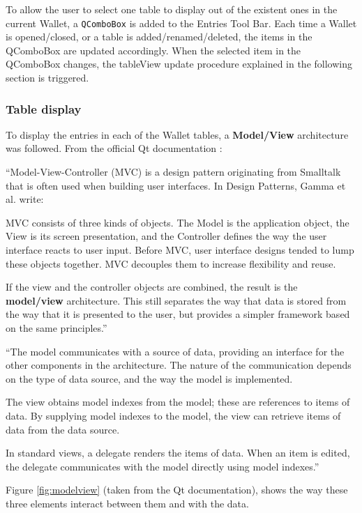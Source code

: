 To allow the user to select one table to display out of the existent ones in the current Wallet, a \texttt{QComboBox} is added to the Entries Tool Bar. Each time a Wallet is opened/closed, or a table is added/renamed/deleted, the items in the QComboBox are updated accordingly. When the selected item in the QComboBox changes, the tableView update procedure explained in the following section is triggered.

\subsubsection*{Table display}
To display the entries in each of the Wallet tables, a \textbf{Model/View} architecture was followed. From the official Qt documentation \cite{modelview}:
 
``Model-View-Controller (MVC) is a design pattern originating from Smalltalk that is often used when building user interfaces. In Design Patterns, Gamma et al. write:

MVC consists of three kinds of objects. The Model is the application object, the View is its screen presentation, and the Controller defines the way the user interface reacts to user input. Before MVC, user interface designs tended to lump these objects together. MVC decouples them to increase flexibility and reuse.

If the view and the controller objects are combined, the result is the \textbf{model/view} architecture. This still separates the way that data is stored from the way that it is presented to the user, but provides a simpler framework based on the same principles.''

``The model communicates with a source of data, providing an interface for the other components in the architecture. The nature of the communication depends on the type of data source, and the way the model is implemented.

The view obtains model indexes from the model; these are references to items of data. By supplying model indexes to the model, the view can retrieve items of data from the data source.

In standard views, a delegate renders the items of data. When an item is edited, the delegate communicates with the model directly using model indexes.''

Figure \ref{fig:modelview} (taken from the Qt documentation), shows the way these three elements interact between them and with the data. 

